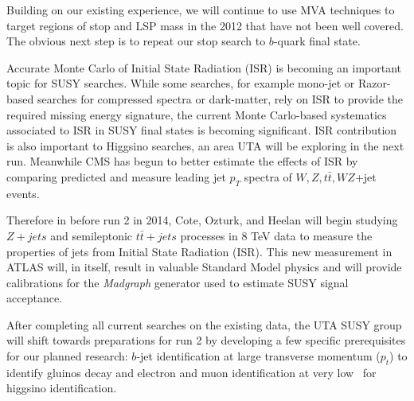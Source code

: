  Building on
our existing experience, we will continue to use MVA techniques to
target regions of stop and LSP mass in the 2012 that have not been
well covered. The obvious next step is to repeat our stop search to
$b$-quark final state.

Accurate Monte Carlo of Initial State Radiation (ISR) is becoming an
important topic for SUSY searches. While some searches, for example
mono-jet or Razor-based searches for compressed spectra or
dark-matter, rely on ISR to provide the required missing energy
signature, the current Monte Carlo-based systematics associated to ISR
in SUSY final states is becoming significant. ISR contribution is also
important to Higgsino searches, an area UTA will be exploring in the
next run. Meanwhile CMS has begun to better estimate the effects of
ISR by comparing predicted and measure leading jet $p_T$ spectra of
$W,Z,t\bar{t},WZ$+jet events.

Therefore in before run 2 in 2014, Cote, Ozturk, and Heelan will begin
studying $Z+jets$ and semileptonic $t\bar{t}+jets$ processes in 8 TeV
data to measure the properties of jets from Initial State Radiation
(ISR).  This new measurement in ATLAS will, in itself, result in
valuable Standard Model physics and will provide calibrations for the
\emph{Madgraph} generator used to estimate SUSY signal acceptance.

After completing all current searches on the existing data, the UTA
SUSY group will shift towards preparations for run 2 by developing a
few specific prerequisites for our planned research: $b$-jet
identification at large transverse momentum ($p_t$) to identify gluinos
decay and electron and muon identification at
very low \pt\ for higgsino identification.


